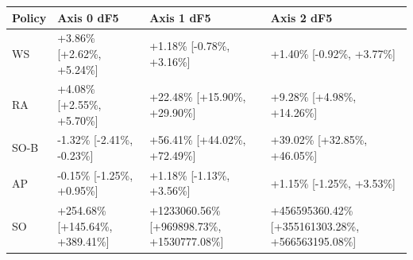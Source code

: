 \begin{tabular}{@{}llll@{}}
\toprule
Policy & Axis 0 dF5 & Axis 1 dF5 & Axis 2 dF5 \\
\midrule
WS & +3.86\% [+2.62\%, +5.24\%] & +1.18\% [-0.78\%, +3.16\%] & +1.40\% [-0.92\%, +3.77\%] \\
RA & +4.08\% [+2.55\%, +5.70\%] & +22.48\% [+15.90\%, +29.90\%] & +9.28\% [+4.98\%, +14.26\%] \\
SO-B & -1.32\% [-2.41\%, -0.23\%] & +56.41\% [+44.02\%, +72.49\%] & +39.02\% [+32.85\%, +46.05\%] \\
AP & -0.15\% [-1.25\%, +0.95\%] & +1.18\% [-1.13\%, +3.56\%] & +1.15\% [-1.25\%, +3.53\%] \\
SO & +254.68\% [+145.64\%, +389.41\%] & +1233060.56\% [+969898.73\%, +1530777.08\%] & +456595360.42\% [+355161303.28\%, +566563195.08\%] \\
\bottomrule
\end{tabular}
